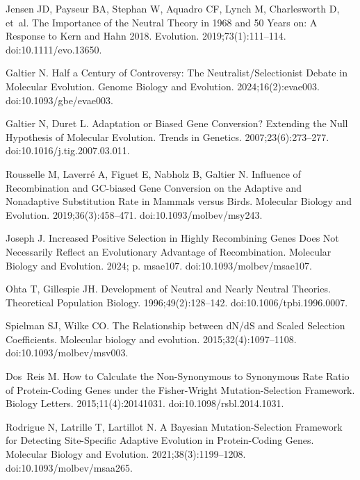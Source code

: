 \documentclass[10pt,letterpaper]{article}
\begin{document}
\begin{thebibliography}{10}
Jensen JD, Payseur BA, Stephan W, Aquadro CF, Lynch M, Charlesworth D, et~al.
\newblock The Importance of the {{Neutral Theory}} in 1968 and 50 Years on:
{{A}} Response to {{Kern}} and {{Hahn}} 2018.
\newblock Evolution. 2019;73(1):111--114.
\newblock doi:{10.1111/evo.13650}.

Galtier N.
\newblock Half a {{Century}} of {{Controversy}}: {{The
Neutralist}}/{{Selectionist Debate}} in {{Molecular Evolution}}.
\newblock Genome Biology and Evolution. 2024;16(2):evae003.
\newblock doi:{10.1093/gbe/evae003}.

Galtier N, Duret L.
\newblock Adaptation or Biased Gene Conversion? {{Extending}} the Null
Hypothesis of Molecular Evolution.
\newblock Trends in Genetics. 2007;23(6):273--277.
\newblock doi:{10.1016/j.tig.2007.03.011}.

Rousselle M, Laverr{\'e} A, Figuet E, Nabholz B, Galtier N.
\newblock Influence of {{Recombination}} and {{GC-biased Gene Conversion}} on
the {{Adaptive}} and {{Nonadaptive Substitution Rate}} in {{Mammals}} versus
{{Birds}}.
\newblock Molecular Biology and Evolution. 2019;36(3):458--471.
\newblock doi:{10.1093/molbev/msy243}.

Joseph J.
\newblock Increased {{Positive Selection}} in {{Highly Recombining Genes Does}}
Not {{Necessarily Reflect}} an {{Evolutionary Advantage}} of
{{Recombination}}.
\newblock Molecular Biology and Evolution. 2024; p. msae107.
\newblock doi:{10.1093/molbev/msae107}.

Ohta T, Gillespie JH.
\newblock Development of {{Neutral}} and {{Nearly Neutral Theories}}.
\newblock Theoretical Population Biology. 1996;49(2):128--142.
\newblock doi:{10.1006/tpbi.1996.0007}.

Spielman SJ, Wilke CO.
\newblock The Relationship between {{dN}}/{{dS}} and Scaled Selection
Coefficients.
\newblock Molecular biology and evolution. 2015;32(4):1097--1108.
\newblock doi:{10.1093/molbev/msv003}.

Dos~Reis M.
\newblock How to Calculate the Non-Synonymous to Synonymous Rate Ratio of
Protein-Coding Genes under the Fisher-Wright Mutation-Selection Framework.
\newblock Biology Letters. 2015;11(4):20141031.
\newblock doi:{10.1098/rsbl.2014.1031}.

Rodrigue N, Latrille T, Lartillot N.
\newblock A {{Bayesian}} Mutation-Selection Framework for Detecting
Site-Specific Adaptive Evolution in Protein-Coding Genes.
\newblock Molecular Biology and Evolution. 2021;38(3):1199--1208.
\newblock doi:{10.1093/molbev/msaa265}.


\end{thebibliography}
\end{document}
